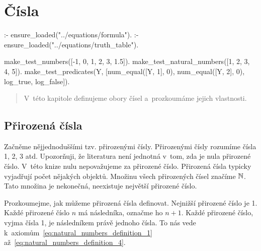\chapter{Čísla}

\begin{prolog}
:- ensure_loaded("../equations/formula").
:- ensure_loaded("../equations/truth_table").

make_test_numbers([-1, 0, 1, 2, 3, 1.5]).
make_test_natural_numbers([1, 2, 3, 4, 5]).
make_test_predicates(Y, [num_equal([Y, 1], 0), num_equal([Y, 2], 0), log_true, log_false]).
\end{prolog}


\begin{abstract}
V~této kapitole definujeme obory čísel a~prozkoumáme jejich vlastnosti.
\end{abstract}

\section{Přirozená čísla}

Začněme nějjednoduššími tzv. přirozenými čísly. Přirozenými čísly rozumíme čísla 1, 2, 3 atd. Upozorňuji, že literatura není jednotná v~tom, zda je nula přirozené číslo. V~této knize nulu nepovažujeme za přirozené číslo. Přirozená čísla typicky vyjadřují počet nějakých objektů. Množinu všech přirozených čísel značíme \(\mathbb{N}\). Tato množina je nekonečná, neexistuje největší přirozené číslo.

Prozkoumejme, jak můžeme přirozená čísla definovat. Nejnižší přirozené číslo je 1. Každé přirozené číslo \(n\) má
následníka, označme ho \(n + 1\). Každé přirozené číslo, vyjma čísla 1, je následníkem právě jednoho čísla. To nás vede k~axiomům~\eqref{eq:natural_numbers_definition_1} až~\eqref{eq:natural_numbers_definition_4}.

